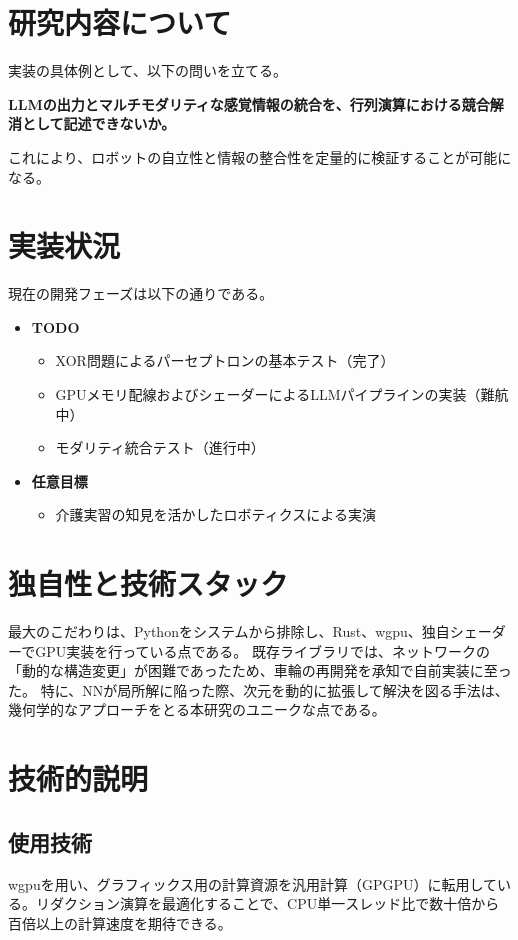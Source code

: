 \documentclass[a4j, twocolumn]{article}
\begin{document}
\section{研究内容について}
実装の具体例として、以下の問いを立てる。
\begin{screen}
\textbf{LLMの出力とマルチモダリティな感覚情報の統合を、行列演算における競合解消として記述できないか。}
\end{screen}
これにより、ロボットの自立性と情報の整合性を定量的に検証することが可能になる。

\section{実装状況}
現在の開発フェーズは以下の通りである。
\begin{itemize}
    \item \textbf{TODO}
    \begin{itemize}
        \item XOR問題によるパーセプトロンの基本テスト（完了）
        \item GPUメモリ配線およびシェーダーによるLLMパイプラインの実装（難航中）
        \item モダリティ統合テスト（進行中）
    \end{itemize}
    \item \textbf{任意目標}
    \begin{itemize}
        \item 介護実習の知見を活かしたロボティクスによる実演
    \end{itemize}
\end{itemize}

\section{独自性と技術スタック}
最大のこだわりは、Pythonをシステムから排除し、Rust、wgpu、独自シェーダーでGPU実装を行っている点である。
既存ライブラリでは、ネットワークの「動的な構造変更」が困難であったため、車輪の再開発を承知で自前実装に至った。
特に、NNが局所解に陥った際、次元を動的に拡張して解決を図る手法は、幾何学的なアプローチをとる本研究のユニークな点である。

\section{技術的説明}
\subsection{使用技術}
wgpuを用い、グラフィックス用の計算資源を汎用計算（GPGPU）に転用している。リダクション演算を最適化することで、CPU単一スレッド比で数十倍から百倍以上の計算速度を期待できる。
\end{document}
